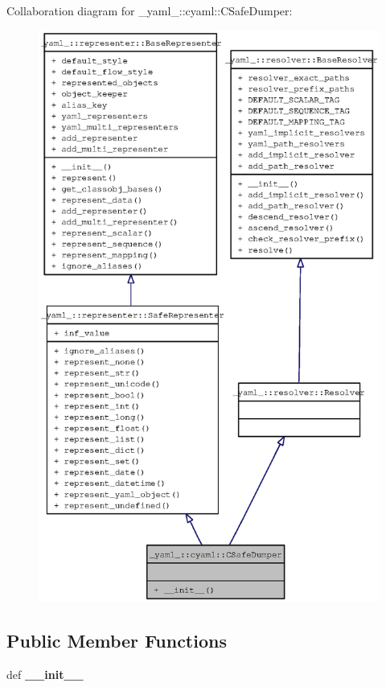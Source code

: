 Collaboration diagram for \_\-yaml\_\-::cyaml::CSafeDumper:\nopagebreak
\begin{figure}[H]
\begin{center}
\leavevmode
\includegraphics[width=400pt]{class__yaml___1_1cyaml_1_1CSafeDumper__coll__graph}
\end{center}
\end{figure}
\subsection*{Public Member Functions}
\begin{CompactItemize}
\item 
def {\bf \_\-\_\-init\_\-\_\-}
\end{CompactItemize}


